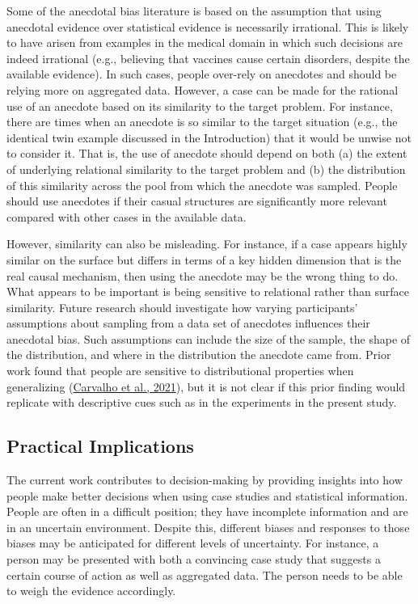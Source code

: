 \documentclass[
  man, donotrepeattitle,floatsintext]{apa7}
\theoremstyle{definition}
\theoremstyle{definition}
\theoremstyle{definition}
\theoremstyle{definition}
\theoremstyle{remark}
\begin{document}
Some of the anecdotal bias literature is based on the assumption that using
anecdotal evidence over statistical evidence is necessarily irrational. This is
likely to have arisen from examples in the medical domain in which such
decisions are indeed irrational (e.g., believing that vaccines cause certain
disorders, despite the available evidence). In such cases, people over-rely on
anecdotes and should be relying more on aggregated data. However, a case can be
made for the rational use of an anecdote based on its similarity to the target
problem. For instance, there are times when an anecdote is so similar to the
target situation (e.g., the identical twin example discussed in the
Introduction) that it would be unwise not to consider it. That is, the use of
anecdote should depend on both (a) the extent of underlying relational
similarity to the target problem and (b) the distribution of this similarity
across the pool from which the anecdote was sampled. People should use anecdotes
if their casual structures are significantly more relevant compared with other
cases in the available data.

However, similarity can also be misleading. For instance, if a case appears
highly similar on the surface but differs in terms of a key hidden dimension
that is the real causal mechanism, then using the anecdote may be the wrong
thing to do. What appears to be important is being sensitive to relational
rather than surface similarity. Future research should investigate how varying
participants' assumptions about sampling from a data set of anecdotes influences
their anecdotal bias. Such assumptions can include the size of the sample, the
shape of the distribution, and where in the distribution the anecdote came from.
Prior work found that people are sensitive to distributional properties when
generalizing (\protect\hyperlink{ref-carvalho2021}{Carvalho et al., 2021}), but it is not clear if this prior finding would
replicate with descriptive cues such as in the experiments in the present study.

\hypertarget{practical-implications}{%
\subsection{Practical Implications}\label{practical-implications}}

The current work contributes to decision-making by providing insights into how
people make better decisions when using case studies and statistical
information. People are often in a difficult position; they have incomplete
information and are in an uncertain environment. Despite this, different biases
and responses to those biases may be anticipated for different levels of
uncertainty. For instance, a person may be presented with both a convincing case
study that suggests a certain course of action as well as aggregated data. The
person needs to be able to weigh the evidence accordingly.
\end{document}
